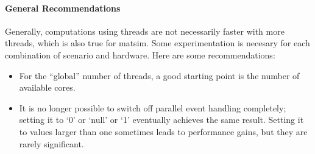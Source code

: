 \paragraph{General Recommendations}

Generally, computations using threads are not necessarily faster with more threads, which is also true for \gls{matsim}. Some experimentation is necesary for each combination of scenario and hardware.  Here are some recommendations:
\begin{itemize}\styleItemize

\item For the ``global'' number of threads, a good starting point is the number of available cores.

\item It is no longer possible to switch off parallel event handling completely; setting it to `0' or `null' or `1' eventually achieves the same result.  Setting it to values larger than one sometimes leads to performance gains, but they are rarely significant.


\end{itemize}
